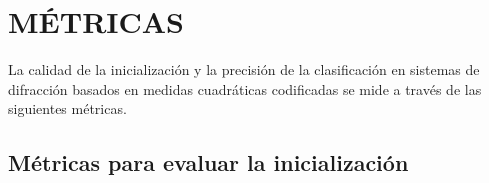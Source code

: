 \begin{table}[!h]
\caption{Resumen de la división de los conjuntos de datos usados para evaluar el método propuesto.}
\centering{}
\label{tab:conjunto_datos}
\end{table}

\section{MÉTRICAS}
La calidad de la inicialización y la precisión de la clasificación en sistemas de difracción basados en medidas cuadráticas codificadas se mide a través de las siguientes métricas.
\subsection{Métricas para evaluar la inicialización}

